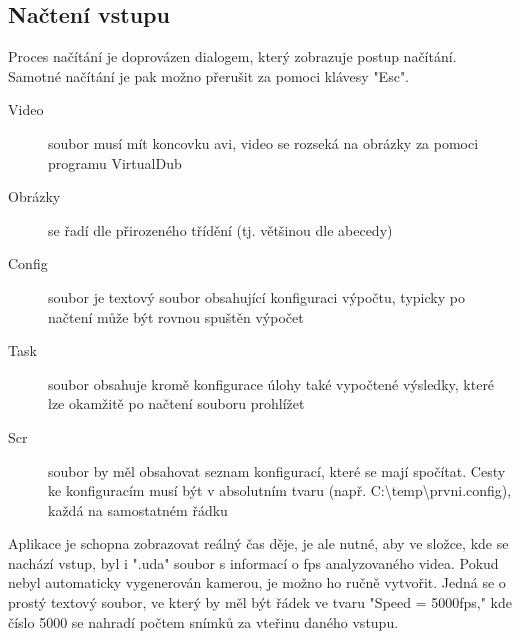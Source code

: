 \documentclass[a4paper,12pt]{article}
\begin{document}
\subsection{Načtení vstupu}
Proces načítání je doprovázen dialogem, který zobrazuje postup načítání. Samotné načítání je pak možno přerušit za pomoci klávesy "Esc".
\begin{description}
\item[Video] soubor musí mít koncovku avi, video se rozseká na obrázky za pomoci programu VirtualDub 
\item[Obrázky] se řadí dle přirozeného třídění (tj. většinou dle abecedy)
\item[Config] soubor je textový soubor obsahující konfiguraci výpočtu, typicky po načtení může být rovnou spuštěn výpočet
\item[Task] soubor obsahuje kromě konfigurace úlohy také vypočtené výsledky, které lze okamžitě po načtení souboru prohlížet
\item[Scr] soubor by měl obsahovat seznam konfigurací, které se mají spočítat. Cesty ke konfiguracím musí být v absolutním tvaru (např. C:\textbackslash temp\textbackslash prvni.config), každá na samostatném řádku
\end{description}
Aplikace je schopna zobrazovat reálný čas děje, je ale nutné, aby ve složce, kde se nachází vstup, byl i ".uda" soubor s informací o fps analyzovaného videa. Pokud nebyl automaticky vygenerován kamerou, je možno ho ručně vytvořit. Jedná se o prostý textový soubor, ve který by měl být řádek ve tvaru "Speed = 5000fps," kde číslo 5000 se nahradí počtem snímků za vteřinu daného vstupu.
\newpage
\end{document}
